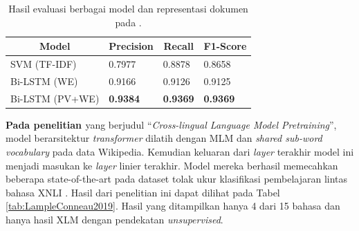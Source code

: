 \begin{table}[]
    \centering
    \caption{Hasil evaluasi berbagai model dan representasi dokumen pada \parencite{CrisdayantiPurwarianti2019}.}
    \begin{tabular}{|l|l|l|l|}
    \hline
    \multicolumn{1}{|c|}{\textbf{Model}} & \multicolumn{1}{c|}{\textbf{Precision}} & \multicolumn{1}{c|}{\textbf{Recall}} & \textbf{F1-Score} \\ \hline
    SVM (TF-IDF)                         & 0.7977                                  & 0.8878                               & 0.8658            \\ \hline
    Bi-LSTM (WE)                         & 0.9166                                  & 0.9126                               & 0.9125            \\ \hline
    Bi-LSTM (PV+WE)                      & \textbf{0.9384}                         & \textbf{0.9369}                      & \textbf{0.9369}   \\ \hline
    \end{tabular}
    \label{tab:CrisdayantiPurwarianti2019}
\end{table}


\textbf{Pada penelitian \parencite{LampleConneau2019}} yang berjudul “\textit{Cross-lingual Language Model Pretraining}”, model berarsitektur \textit{transformer} dilatih dengan MLM dan \textit{shared sub-word vocabulary} pada data Wikipedia. Kemudian keluaran dari \textit{layer} terakhir model ini menjadi masukan ke \textit{layer} linier terakhir. Model mereka berhasil memecahkan beberapa state-of-the-art pada  dataset tolak ukur klasifikasi pembelajaran lintas bahasa XNLI \parencite{Conneau_Rinott_Lample_Williams_Bowman_Schwenk_Stoyanov_2018}. Hasil dari penelitian ini dapat dilihat pada Tabel \ref{tab:LampleConneau2019}. Hasil yang ditampilkan hanya 4 dari 15 bahasa dan hanya hasil XLM dengan pendekatan \textit{unsupervised}.

